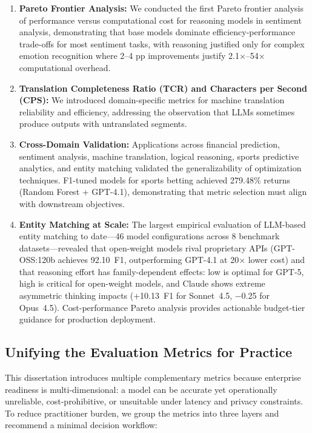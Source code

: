 \begin{enumerate}[leftmargin=*]
    \item \textbf{Pareto Frontier Analysis:} We conducted the first Pareto frontier analysis of performance versus computational cost for reasoning models in sentiment analysis, demonstrating that base models dominate efficiency-performance trade-offs for most sentiment tasks, with reasoning justified only for complex emotion recognition where 2--4 pp improvements justify 2.1$\times$--54$\times$ computational overhead.
    
    \item \textbf{Translation Completeness Ratio (TCR) and Characters per Second (CPS):} We introduced domain-specific metrics for machine translation reliability and efficiency, addressing the observation that LLMs sometimes produce outputs with untranslated segments.
    
    \item \textbf{Cross-Domain Validation:} Applications across financial prediction, sentiment analysis, machine translation, logical reasoning, sports predictive analytics, and entity matching validated the generalizability of optimization techniques. F1-tuned models for sports betting achieved 279.48\% returns (Random Forest + GPT-4.1), demonstrating that metric selection must align with downstream objectives.

    \item \textbf{Entity Matching at Scale:} The largest empirical evaluation of LLM-based entity matching to date---46 model configurations across 8 benchmark datasets---revealed that open-weight models rival proprietary APIs (GPT-OSS:120b achieves 92.10~F1, outperforming GPT-4.1 at 20$\times$ lower cost) and that reasoning effort has family-dependent effects: low is optimal for GPT-5, high is critical for open-weight models, and Claude shows extreme asymmetric thinking impacts (+10.13~F1 for Sonnet~4.5, $-$0.25 for Opus~4.5).  Cost-performance Pareto analysis provides actionable budget-tier guidance for production deployment.
\end{enumerate}

\subsection{Unifying the Evaluation Metrics for Practice}
\label{sec:metric-synthesis}
This dissertation introduces multiple complementary metrics because enterprise readiness is multi-dimensional: a model can be accurate yet operationally unreliable, cost-prohibitive, or unsuitable under latency and privacy constraints. To reduce practitioner burden, we group the metrics into three layers and recommend a minimal decision workflow:

